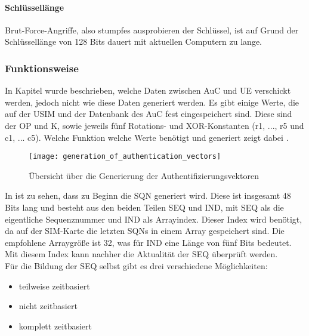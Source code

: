  \paragraph{Schlüssellänge}
 Brut-Force-Angriffe, also stumpfes ausprobieren der Schlüssel, ist auf Grund der
 Schlüssellänge von 128 Bits dauert mit aktuellen Computern zu lange.
 

 \subsubsection{Funktionsweise}
 \label{milenage-funktion}
 In Kapitel  wurde beschrieben, welche Daten zwischen
 \ac{AuC} und \ac{UE} verschickt werden, jedoch nicht wie diese Daten generiert werden. Es
 gibt einige Werte, die auf der \ac{USIM} und der Datenbank des \ac{AuC} fest eingespeichert
 sind. Diese sind der \ac{OP} und \ac{K}, sowie jeweils fünf Rotations- und XOR-Konstanten
 (r1, ..., r5 und c1, ... c5). Welche Funktion welche Werte benötigt und generiert zeigt dabei .
 
 \begin{figure}[htp]
  \begin{center}
   \texttt{[image: generation\_of\_authentication\_vectors]}
  \end{center}
  \caption[Übersicht über die Generierung der Authentifizierungsvektoren]{Übersicht über die Generierung der Authentifizierungsvektoren \cite{3gpp.33.102}}
  \label{fig:funktionsubersicht}
 \end{figure}
 
 In  ist zu sehen, dass zu Beginn die \ac{SQN} generiert wird.
 Diese ist insgesamt 48 Bits lang und besteht aus den beiden Teilen SEQ und IND, mit SEQ als
 die eigentliche Sequenznummer und IND als Arrayindex. Dieser Index wird benötigt, da auf
 der SIM-Karte die letzten SQNs in einem Array gespeichert sind. Die empfohlene Arraygröße ist
 32, was für IND eine Länge von fünf Bits bedeutet. Mit diesem Index kann nachher die
 Aktualität der SEQ überprüft werden.\cite{3gpp.33.102} \\
 Für die Bildung der SEQ selbst gibt es drei verschiedene Möglichkeiten:
 \begin{itemize}
  \item teilweise zeitbasiert
  \item nicht zeitbasiert
  \item komplett zeitbasiert
 \end{itemize}
 

